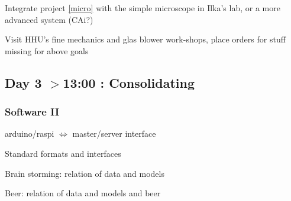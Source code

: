 \documentclass[12pt,a4paper]{article}
\begin{document}
Integrate project \ref{micro} with the simple microscope in Ilka's lab,
or a more advanced system (CAi?)

Visit HHU's fine mechanics and glas blower work-shops, place orders 
for stuff missing for above goals


\subsection{Day 3 $>$13:00 : Consolidating}

\subsubsection{Software II}
arduino/raspi $\Leftrightarrow$  master/server interface

Standard formats and interfaces

Brain storming: relation of data and models

Beer: relation of data and models and beer
\end{document}
